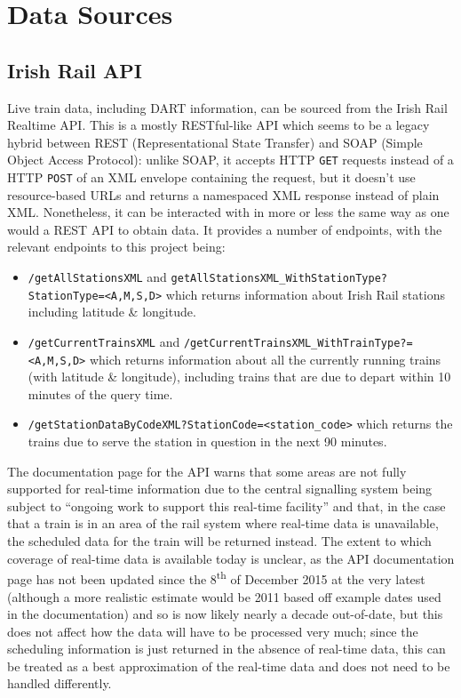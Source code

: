 \documentclass[a4paper,11pt]{report}
\begin{document}
\section{Data Sources}
\subsection{Irish Rail API}
Live train data, including DART information, can be sourced from the Irish Rail Realtime API\supercite{irishrailapi}.
This is a mostly RESTful-like  API which seems to be a legacy hybrid between REST\supercite{fielding2000rest} (Representational State Transfer) and SOAP\supercite{box2000soap} (Simple Object Access Protocol): unlike SOAP, it accepts HTTP \verb|GET| requests instead of a HTTP \verb|POST| of an XML envelope containing the request, but it doesn't use resource-based URLs and returns a namespaced XML response instead of plain XML.
Nonetheless, it can be interacted with in more or less the same way as one would a REST API to obtain data.
It provides a number of endpoints, with the relevant endpoints to this project being:
\begin{itemize}
    \item   \verb|/getAllStationsXML| and \verb|getAllStationsXML_WithStationType?StationType=<A,M,S,D>| which returns information about Irish Rail stations including latitude \& longitude.
    \item   \verb|/getCurrentTrainsXML| and \verb|/getCurrentTrainsXML_WithTrainType?=<A,M,S,D>| which returns information about all the currently running trains (with latitude \& longitude), including trains that are due to depart within 10 minutes of the query time.
    \item   \verb|/getStationDataByCodeXML?StationCode=<station_code>| which returns the trains due to serve the station in question in the next 90 minutes.
\end{itemize}

The documentation page for the API warns that some areas are not fully supported for real-time information due to the central signalling system being subject to ``ongoing work to support this real-time facility'' and that, in the case that a train is in an area of the rail system where real-time data is unavailable, the scheduled data for the train will be returned instead.
The extent to which coverage of real-time data is available today is unclear, as the API documentation page has not been updated since the 8\textsuperscript{th} of December 2015 at the very latest\supercite{irishrail-api-archive} (although a more realistic estimate would be 2011 based off example dates used in the documentation) and so is now likely nearly a decade out-of-date, but this does not affect how the data will have to be processed very much;
since the scheduling information is just returned in the absence of real-time data, this can be treated as a best approximation of the real-time data and does not need to be handled differently.
\end{document}
